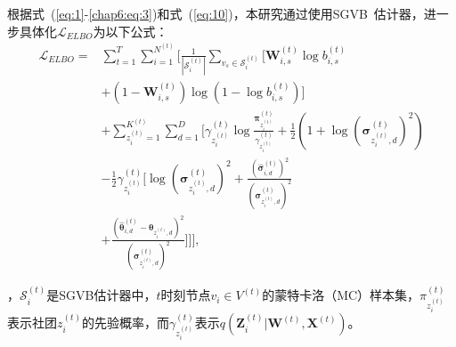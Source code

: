 根据式~(\ref{eq:1}-\ref{chap6:eq:3})和式~(\ref{eq:10})，本研究通过使用SGVB~\cite{kingma2013auto}估计器，进一步具体化$\mathcal{L}_{ELBO}$为以下公式：
\begin{align} 
{\mathcal{L}_{ELBO}}  = &\sum_{t=1}^T \sum_{i=1}^{N^{(t)}}\Bigg[ \frac{1}{|\mathcal{S}_i^{(t)}|} \sum_{v_s\in \mathcal{S}_i^{(t)}} \Big[ \mathbf{W}_{i,s}^{(t)}\log{b_{i,s}^{(t)}} \nonumber\\
& + (1-\mathbf{W}_{i,s}^{(t)}) \log(1-\log{b_{i,s}^{(t)}}) \Big]\nonumber \\
&  + \sum_{z_i^{(t)}=1}^{K^{(t)}} \sum_{d=1}^{D}\Big[ \gamma_{z_i^{(t)}}^{(t)} \log\frac{\bm{\pi}_{z_i^{(t)}}^{(t)}}{\gamma_{z_i^{(t)}}^{(t)}} + \frac{1}{2} (1 + \log(\bm{\sigma}_{z_i^{(t)},d}^{(t)})^2) \nonumber\\
& - \frac{1}{2} \gamma_{z_i^{(t)}}^{(t)} \big[\log{(\bm{\sigma}_{z_i^{(t)},d}^{(t)})^2} + \frac{(\hat{\bm{\sigma}}_{i,d}^{(t)})^2}{(\bm{\sigma}_{z_i^{(t)},d}^{(t)})^2} \nonumber\\
& + \frac{({\hat{\bm{\theta}}}_{i,d}^{(t)} - \bm{\theta}_{z_i^{(t)},d})^{2}}{(\bm{\sigma}_{z_i^{(t)},d}^{(t)})^2}\big]\Big] \Bigg], 
\label{eq:16}
\end{align}

，$\mathcal{S}_i^{(t)}$是SGVB估计器中，$t$时刻节点$v_i \in V^{(t)}$的蒙特卡洛（MC）样本集，$\pi_{z_i^{(t)}}^{(t)}$表示社团$z_i^{(t)}$的先验概率，而$\gamma_{z_i^{(t)}}^{(t)}$表示$q(\mathbf{Z}_i^{(t)}|\mathbf{W}^{(t)},\mathbf{X}^{(t)})$。

